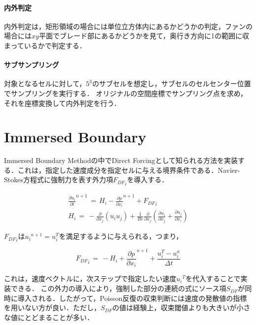 %
\paragraph{内外判定}
内外判定は，矩形領域の場合には単位立方体内にあるかどうかの判定，ファンの場合には$xy$平面でブレード部にあるかどうかを見て，奥行き方向に1の範囲に収まっているかで判定する．

%
\paragraph{サブサンプリング}
対象となるセルに対して，$5^3$のサブセルを想定し，サブセルのセルセンター位置でサンプリングを実行する．
オリジナルの空間座標でサンプリング点を求め，それを座標変換して内外判定を行う．

\pagebreak
%
\section{Immersed Boundary}
\label{sec:Immersed Boundary Method}
Immersed Boundary Methodの中でDirect Forcingとして知られる方法\cite{Yusof:97:CTR-ARB}を実装する．これは，指定した速度成分を指定セルに与える境界条件である．Navier-Stokes方程式に強制力を表す外力項${F_{DF}}_{i}$を導入する．

\begin{equation}
\begin{array}{l}
\displaystyle{
{\frac{\partial u_{i}}{\partial t}}^{n+1} 
\, =\, H_{i}
- {\frac{\partial p}{\partial x_{i}}}^{n+1} + {F_{DF}}_{i}
}\\
\displaystyle{
H_{i} \,=\, - \frac{\partial}{\partial x_{j}} \left({ u_{i} u_{j} }\right)
+ \frac{1}{Re} \frac{\partial}{\partial x_{j}} 
\left({ \frac{\partial u_{i}}{\partial x_{j}} + \frac{\partial u_{j}}{\partial x_{i}} }\right) 
}
\end{array}
\label{NS_IB ND}
\end{equation}

${F_{DF}}_{i}$は${u_{i}}^{n+1}=u_{i}^{T}$を満足するように与えられる，つまり，

\begin{equation}
{F_{DF}}_{i} \,=\, - H_{i} 
+ {\frac{\partial p}{\partial x_{i}}}^{n+1}
+ \frac{u_{i}^{T} - u_{i}^{n}}{\Delta t}
\label{Direct forcing term}
\end{equation}

これは，速度ベクトルに，次ステップで指定したい速度${u_{i}}^{T}$を代入することで実装できる．
この外力の導入により，強制した部分の連続の式にソース項$S_{DF}$が同時に導入される．したがって，Poisson反復の収束判断には速度の発散値の指標を用いない方が良い．ただし，$S_{DF}$の値は経験上，収束閾値よりも大きいが小さな値にとどまることが多い．

